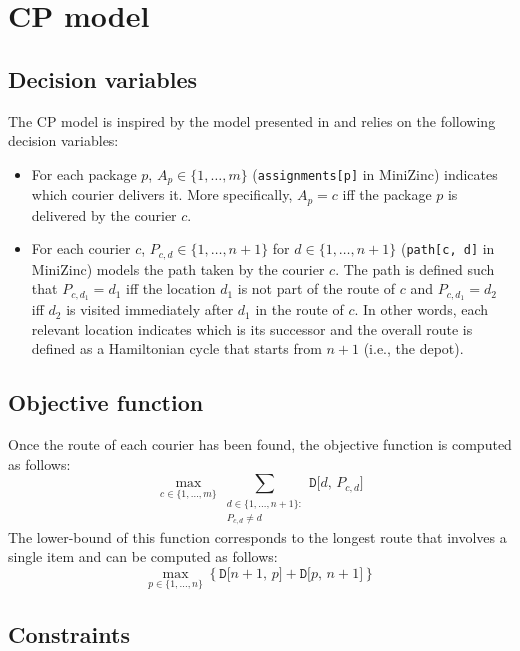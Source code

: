 \section{CP model}


\subsection{Decision variables}

The CP model is inspired by the model presented in \cite{vrp} and relies on the following decision variables:
\begin{itemize}
    \item For each package $p$, $A_p \in \{ 1, \dots, m \}$ (\texttt{assignments[p]} in MiniZinc) indicates which courier delivers it. More specifically, $A_p = c$ iff the package $p$ is delivered by the courier $c$.
    
    \item For each courier $c$, $P_{c, d} \in \{ 1, \dots, n+1 \}$ for $d \in \{ 1, \dots, n+1 \}$ (\texttt{path[c, d]} in MiniZinc) models the path taken by the courier $c$. The path is defined such that $P_{c, d_1} = d_1$ iff the location $d_1$ is not part of the route of $c$ and $P_{c, d_1} = d_2$ iff $d_2$ is visited immediately after $d_1$ in the route of $c$. In other words, each relevant location indicates which is its successor and the overall route is defined as a Hamiltonian cycle that starts from $n+1$ (i.e., the depot).
\end{itemize}



\subsection{Objective function}
Once the route of each courier has been found, the objective function is computed as follows:
\begin{equation}
    \max_{c \in \{ 1, \dots, m \}} \sum_{\substack{d \in \{1, \dots, n+1\}:\\P_{c, d} \neq d}} \texttt{D[$d$, $P_{c, d}$]} 
\end{equation}
The lower-bound of this function corresponds to the longest route that involves a single item and can be computed as follows:
\begin{equation}
    \max_{p \in \{ 1, \dots, n \}} \left\{ \texttt{D[$n+1$, $p$]} + \texttt{D[$p$, $n+1$]} \right\}
\end{equation}


\subsection{Constraints}


